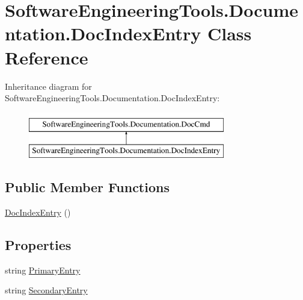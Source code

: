 \hypertarget{class_software_engineering_tools_1_1_documentation_1_1_doc_index_entry}{\section{Software\+Engineering\+Tools.\+Documentation.\+Doc\+Index\+Entry Class Reference}
\label{class_software_engineering_tools_1_1_documentation_1_1_doc_index_entry}
}
Inheritance diagram for Software\+Engineering\+Tools.\+Documentation.\+Doc\+Index\+Entry\+:\begin{figure}[H]
\begin{center}
\leavevmode
\includegraphics[height=2.000000cm]{class_software_engineering_tools_1_1_documentation_1_1_doc_index_entry}
\end{center}
\end{figure}
\subsection*{Public Member Functions}
\begin{DoxyCompactItemize}
\item 
\hyperlink{class_software_engineering_tools_1_1_documentation_1_1_doc_index_entry_af4d7a6e93f1384f3e1aec974f294986d}{Doc\+Index\+Entry} ()
\end{DoxyCompactItemize}
\subsection*{Properties}
\begin{DoxyCompactItemize}
\item 
string \hyperlink{class_software_engineering_tools_1_1_documentation_1_1_doc_index_entry_aec1df763bc86dffdc381693aefe66131}{Primary\+Entry}
\item 
string \hyperlink{class_software_engineering_tools_1_1_documentation_1_1_doc_index_entry_a0c508fb0b715f0eb8709ed6ba728f0ce}{Secondary\+Entry}
\end{DoxyCompactItemize}


